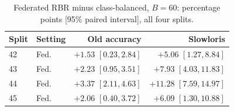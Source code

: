 \begin{table}[t]
\centering
\caption{Federated RBR minus class-balanced, $B=60$: percentage points [95\% paired interval], all four splits.}
\label{tab:fedsplits}
\footnotesize
\setlength{\tabcolsep}{3pt}
\begin{tabular}{llrr}
\toprule
Split & Setting & Old accuracy & Slowloris\\
\midrule
42 & Fed. & $+1.53$ $[0.23,2.84]$ & $+5.06$ $[1.27,8.84]$\\
43 & Fed. & $+2.23$ $[0.95,3.51]$ & $+7.93$ $[4.03,11.83]$\\
44 & Fed. & $+3.37$ $[2.11,4.63]$ & $+11.28$ $[7.59,14.97]$\\
45 & Fed. & $+2.06$ $[0.40,3.72]$ & $+6.09$ $[1.30,10.88]$\\
\bottomrule
\end{tabular}
\end{table}
